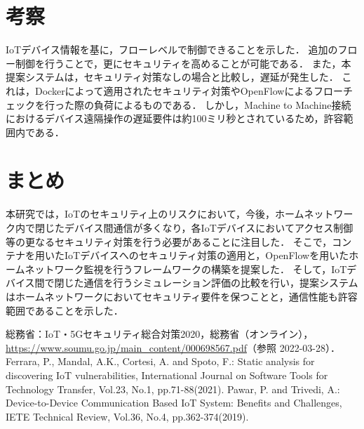 \documentclass[a4paper,10pt,twocolumn,uplatex]{jsarticle}
\begin{document}
\section{考察}
IoTデバイス情報を基に，フローレベルで制御できることを示した．
追加のフロー制御を行うことで，更にセキュリティを高めることが可能である．
また，本提案システムは，セキュリティ対策なしの場合と比較し，遅延が発生した．
これは，Dockerによって適用されたセキュリティ対策やOpenFlowによるフローチェックを行った際の負荷によるものである．
しかし，Machine to Machine接続におけるデバイス遠隔操作の遅延要件は約100ミリ秒とされているため，許容範囲内である．


\section{まとめ}
本研究では，IoTのセキュリティ上のリスクにおいて，今後，ホームネットワーク内で閉じたデバイス間通信が多くなり，各IoTデバイスにおいてアクセス制御等の更なるセキュリティ対策を行う必要があることに注目した．
そこで，コンテナを用いたIoTデバイスへのセキュリティ対策の適用と，OpenFlowを用いたホームネットワーク監視を行うフレームワークの構築を提案した．
そして，IoTデバイス間で閉じた通信を行うシミュレーション評価の比較を行い，提案システムはホームネットワークにおいてセキュリティ要件を保つことと，通信性能も許容範囲であることを示した．

\footnotesize{
  \begin{thebibliography}{99}
     総務省：IoT・5Gセキュリティ総合対策2020，総務省（オンライン），
    \url{https://www.soumu.go.jp/main_content/000698567.pdf}（参照 2022-03-28）．
     Ferrara, P., Mandal, A.K., Cortesi, A. and Spoto, F.: Static analysis for discovering IoT vulnerabilities, International Journal on Software Tools for Technology Transfer, Vol.23, No.1, pp.71-88(2021).
     Pawar, P. and Trivedi, A.: Device-to-Device Communication Based IoT System: Benefits and Challenges, IETE Technical Review, Vol.36, No.4, pp.362-374(2019).
  \end{thebibliography}
}

% 
% 

\end{document}
